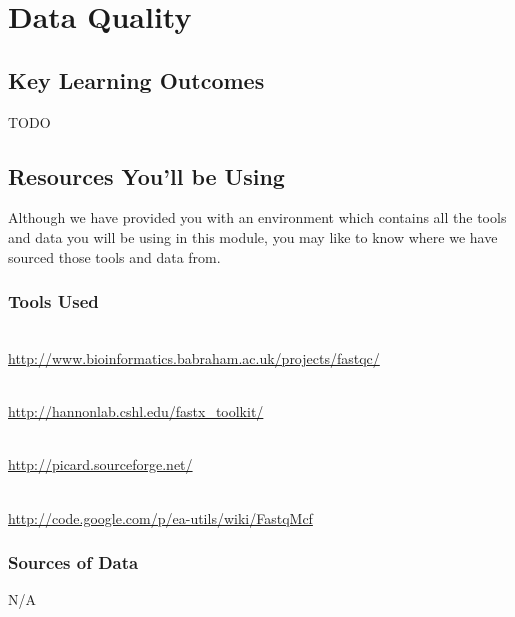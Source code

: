 \renewcommand{\moduleTitle}{Data Quality}
\renewcommand{\moduleAuthors}{%
  Sonika Tyagi (sonika.tyagi@agrf.org.au)
} \renewcommand{\moduleContributions}{%
  Nathan S. Watson-Haigh (nathan.watson-haigh@awri.com.au)%
}

\chapter{\moduleTitle}
\newpage

\section{Key Learning Outcomes}

TODO

\section{Resources You'll be Using}
Although we have provided you with an environment which contains all the tools
and data you will be using in this module, you may like to know where we have
sourced those tools and data from.
 
\subsection{Tools Used}
\begin{description}[style=multiline,labelindent=0cm,align=left,leftmargin=0.5cm]
  \item[FastQC]\hfill\\
  	\url{http://www.bioinformatics.babraham.ac.uk/projects/fastqc/}
  \item[fastx-toolkit]\hfill\\
  	\url{http://hannonlab.cshl.edu/fastx_toolkit/}
  \item[picard]\hfill\\
  	\url{http://picard.sourceforge.net/}
  \item[fastqmcf]\hfill\\
  	\url{http://code.google.com/p/ea-utils/wiki/FastqMcf}
\end{description}

\subsection{Sources of Data}
N/A

